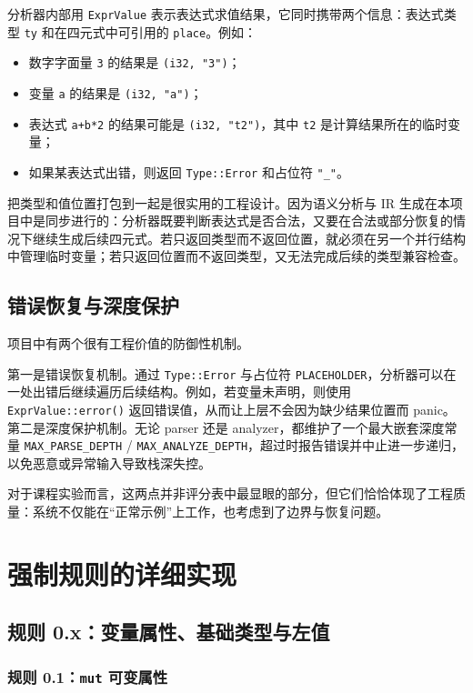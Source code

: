\documentclass[UTF8,a4paper,12pt]{ctexart}
\newcommand{\pkg}[1]{\texttt{#1}}
\begin{document}
分析器内部用 \pkg{ExprValue} 表示表达式求值结果，它同时携带两个信息：表达式类型 \pkg{ty} 和在四元式中可引用的 \pkg{place}。例如：

\begin{itemize}
    \item 数字字面量 \pkg{3} 的结果是 \pkg{(i32, "3")}；
    \item 变量 \pkg{a} 的结果是 \pkg{(i32, "a")}；
    \item 表达式 \pkg{a+b*2} 的结果可能是 \pkg{(i32, "t2")}，其中 \pkg{t2} 是计算结果所在的临时变量；
    \item 如果某表达式出错，则返回 \pkg{Type::Error} 和占位符 \pkg{"\_"}。
\end{itemize}

把类型和值位置打包到一起是很实用的工程设计。因为语义分析与 IR 生成在本项目中是同步进行的：分析器既要判断表达式是否合法，又要在合法或部分恢复的情况下继续生成后续四元式。若只返回类型而不返回位置，就必须在另一个并行结构中管理临时变量；若只返回位置而不返回类型，又无法完成后续的类型兼容检查。

\subsection{错误恢复与深度保护}

项目中有两个很有工程价值的防御性机制。

第一是错误恢复机制。通过 \pkg{Type::Error} 与占位符 \pkg{PLACEHOLDER}，分析器可以在一处出错后继续遍历后续结构。例如，若变量未声明，则使用 \pkg{ExprValue::error()} 返回错误值，从而让上层不会因为缺少结果位置而 panic。第二是深度保护机制。无论 parser 还是 analyzer，都维护了一个最大嵌套深度常量 \pkg{MAX\_PARSE\_DEPTH} / \pkg{MAX\_ANALYZE\_DEPTH}，超过时报告错误并中止进一步递归，以免恶意或异常输入导致栈深失控。

对于课程实验而言，这两点并非评分表中最显眼的部分，但它们恰恰体现了工程质量：系统不仅能在“正常示例”上工作，也考虑到了边界与恢复问题。

\section{强制规则的详细实现}

\subsection{规则 0.x：变量属性、基础类型与左值}

\subsubsection{规则 0.1：\pkg{mut} 可变属性}
\end{document}
